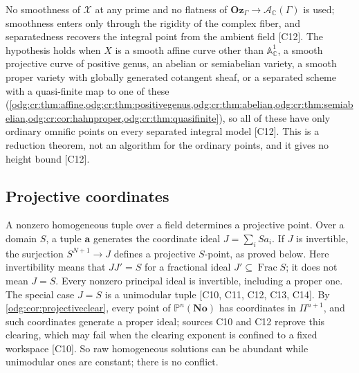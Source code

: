 \documentclass[11pt,oneside]{article}
\numberwithin{equation}{section}
\theoremstyle{definition}
\theoremstyle{remark}
\newcommand{\No}{\mathbf{No}}
\newcommand{\Oz}{\mathbf{Oz}}
\newcommand{\C}{\mathbb C}
\newcommand{\Frac}{\operatorname{Frac}}
\newcommand{\src}[1]{\textup{\textsf{\small[#1]}}}
\newcommand{\Aff}{\mathbb A}
\begin{document}
No smoothness of $\mathcal X$ at any prime and no flatness of
$\Oz_\Gamma\to\mathcal A_\C(\Gamma)$ is used; smoothness enters only through the
rigidity of the complex fiber, and separatedness recovers the integral point from
the ambient field \src{C12}. The hypothesis holds when $X$ is a smooth affine curve
other than $\Aff^1_\C$, a smooth projective curve of positive genus, an abelian or
semiabelian variety, a smooth proper variety with globally generated cotangent
sheaf, or a separated scheme with a quasi-finite map to one of these
(\cref{odg:cr:thm:affine,odg:cr:thm:positivegenus,odg:cr:thm:abelian,odg:cr:thm:semiabelian,odg:cr:cor:hahnproper,odg:cr:thm:quasifinite}),
so all of these have only ordinary omnific points on every separated integral
model \src{C12}. This is a reduction theorem, not an algorithm for the ordinary
points, and it gives no height bound \src{C12}.

\subsection{Projective coordinates}\label{odg:cr:sub:projective}

A nonzero homogeneous tuple over a field determines a projective point. Over a
domain $S$, a tuple $\mathbf a$ generates the coordinate ideal
$J=\sum_i Sa_i$. If $J$ is invertible, the surjection $S^{N+1}\to J$ defines
a projective $S$-point, as proved below. Here invertibility means that
$JJ'=S$ for a fractional ideal $J'\subseteq\Frac S$; it does not mean
$J=S$. Every nonzero principal ideal is invertible, including a proper one.
The special case $J=S$ is a unimodular tuple
\src{C10, C11, C12, C13, C14}. By \cref{odg:cor:projectiveclear},
every point of $\mathbb P^n(\No)$ has coordinates in $\Pi^{n+1}$, and such
coordinates generate a proper ideal; sources C10 and C12 reprove this clearing,
which may fail when the clearing exponent is confined to a fixed workspace
\src{C10}. So raw homogeneous solutions can be abundant while unimodular ones are
constant; there is no conflict.
\end{document}
